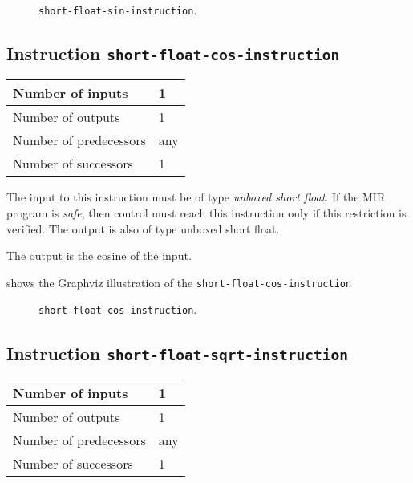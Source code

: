 \begin{figure}
\begin{center}
\end{center}
\caption{\label{fig-short-float-sin-instruction}
\texttt{short-float-sin-instruction}.}
\end{figure}

\subsection{Instruction \texttt{short-float-cos-instruction}}
\label{mir-instruction-short-float-div}

\begin{tabular}{|l|l|}
\hline
Number of inputs & 1\\
\hline
Number of outputs & 1\\
\hline
Number of predecessors & any\\
\hline
Number of successors & 1\\
\hline
\end{tabular}

The input to this instruction must be of type \emph{unboxed short
  float}.  If the MIR program is \emph{safe}, then control must reach
this instruction only if this restriction is verified.  The output is
also of type unboxed short float.

The output is the cosine of the input.

 shows the Graphviz illustration of the
\texttt{short-float-cos-instruction}

\begin{figure}
\begin{center}
\end{center}
\caption{\label{fig-short-float-cos-instruction}
\texttt{short-float-cos-instruction}.}
\end{figure}

\subsection{Instruction \texttt{short-float-sqrt-instruction}}
\label{mir-instruction-short-float-div}

\begin{tabular}{|l|l|}
\hline
Number of inputs & 1\\
\hline
Number of outputs & 1\\
\hline
Number of predecessors & any\\
\hline
Number of successors & 1\\
\hline
\end{tabular}

